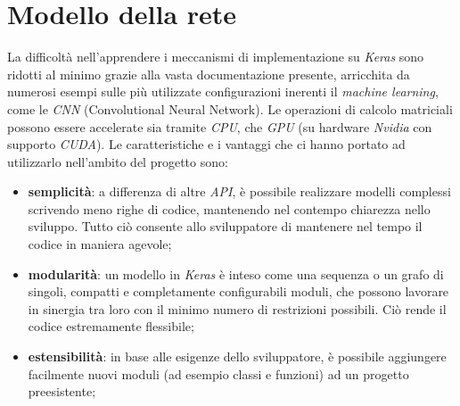 \section{Modello della rete}
La difficoltà nell’apprendere i meccanismi di implementazione su \textit{Keras} sono ridotti al minimo grazie alla vasta documentazione presente, arricchita da numerosi esempi sulle più utilizzate configurazioni inerenti il \textit{machine learning}, come le \textit{CNN} (Convolutional Neural Network).
Le operazioni di calcolo matriciali possono essere accelerate sia tramite \textit{CPU}, che \textit{GPU} (su hardware \textit{Nvidia} con supporto \textit{CUDA}).
Le caratteristiche e i vantaggi che ci hanno portato ad utilizzarlo nell’ambito del progetto sono:
\begin{itemize}
	\item \textbf{semplicità}: a differenza di altre \textit{API}, è possibile realizzare modelli complessi scrivendo meno righe di codice, mantenendo nel contempo chiarezza nello sviluppo. Tutto ciò consente allo sviluppatore di mantenere nel tempo il codice in maniera agevole;
	\item \textbf{modularità}: un modello in \textit{Keras} è inteso come una sequenza o un grafo di singoli, compatti e completamente configurabili moduli, che possono lavorare in sinergia tra loro con il minimo numero di restrizioni possibili. Ciò rende il codice estremamente flessibile;
	\item \textbf{estensibilità}: in base alle esigenze dello sviluppatore, è possibile aggiungere facilmente nuovi moduli (ad esempio classi e funzioni) ad un progetto preesistente;
\end{itemize}
